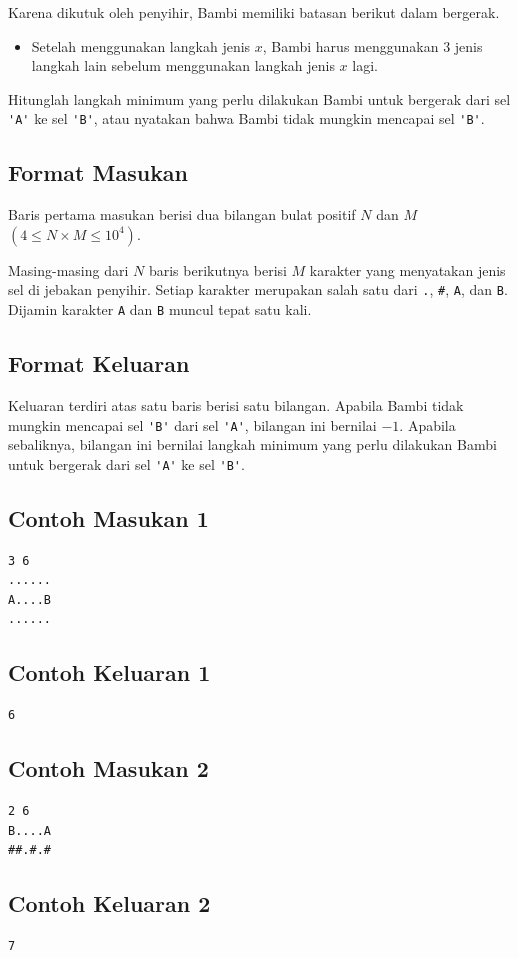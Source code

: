 \documentclass{article}
\begin{document}
Karena dikutuk oleh penyihir, Bambi memiliki batasan berikut dalam bergerak.
\begin{itemize}
    \item Setelah menggunakan langkah jenis $x$, Bambi harus menggunakan $3$ jenis langkah lain sebelum menggunakan langkah jenis $x$ lagi.
\end{itemize}
Hitunglah langkah minimum yang perlu dilakukan Bambi untuk bergerak dari sel \verb|'A'| ke sel \verb|'B'|, atau nyatakan bahwa Bambi tidak mungkin mencapai sel \verb|'B'|.

\subsection*{Format Masukan}
Baris pertama masukan berisi dua bilangan bulat positif $N$ dan $M$ $(4 \leq N \times M \leq 10^4)$. 

Masing-masing dari $N$ baris berikutnya berisi $M$ karakter yang menyatakan jenis sel di jebakan penyihir. Setiap karakter merupakan salah satu dari \verb|.|, \verb|#|, \verb|A|, dan \verb|B|. Dijamin karakter \verb|A| dan \verb|B| muncul tepat satu kali.


\subsection*{Format Keluaran}
Keluaran terdiri atas satu baris berisi satu bilangan. Apabila Bambi tidak mungkin mencapai sel \verb|'B'| dari sel \verb|'A'|, bilangan ini bernilai $-1$. Apabila sebaliknya, bilangan ini bernilai langkah minimum yang perlu dilakukan Bambi untuk bergerak dari sel \verb|'A'| ke sel \verb|'B'|.

\begin{multicols}{2}
\subsection*{Contoh Masukan 1}
\begin{lstlisting}
3 6
......
A....B
......
\end{lstlisting}
\columnbreak
\subsection*{Contoh Keluaran 1}
\begin{lstlisting}
6
\end{lstlisting}
\vfill
\null
\end{multicols}

\begin{multicols}{2}
\subsection*{Contoh Masukan 2}
\begin{lstlisting}
2 6
B....A
##.#.#
\end{lstlisting}
\columnbreak
\subsection*{Contoh Keluaran 2}
\begin{lstlisting}
7
\end{lstlisting}
\vfill
\null
\end{multicols}
\end{document}
